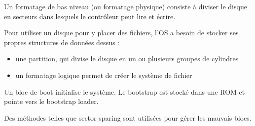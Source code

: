 Un formatage de bas niveau (ou formatage physique) consiste à diviser le disque en secteurs dans lesquels le contrôleur peut lire et écrire.

Pour utiliser un disque pour y placer des fichiers, l'OS a besoin de stocker ses propres structures de données dessus :

\begin{itemize}
	\item une partition, qui divise le disque en un ou plusieurs groupes de cylindres
	\item un formatage logique permet de créer le système de fichier
\end{itemize}

Un bloc de boot initialise le système. Le bootstrap est stocké dans une ROM et pointe vers le bootstrap loader.

Des méthodes telles que sector sparing sont utilisées pour gérer les mauvais blocs.


